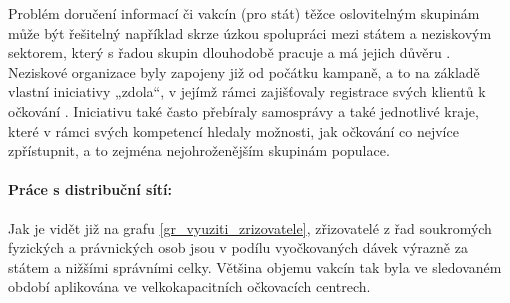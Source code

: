 Problém doručení informací či vakcín (pro stát) těžce oslovitelným skupinám může být řešitelný například skrze úzkou spolupráci mezi státem a neziskovým sektorem, který s řadou skupin dlouhodobě pracuje a má jejich důvěru \cite{logoc_bilamista}. Neziskové organizace byly zapojeny již od počátku kampaně, a to na základě vlastní iniciativy „zdola“, v jejímž rámci zajišťovaly registrace svých klientů k očkování \cite{ocko_ngo}. Iniciativu také často přebíraly samosprávy a také jednotlivé kraje, které v rámci svých kompetencí hledaly možnosti, jak očkování co nejvíce zpřístupnit, a to zejména nejohroženějším skupinám populace. 




\paragraph{Práce s distribuční sítí:} Jak je vidět již na grafu \ref{gr_vyuziti_zrizovatele}, zřizovatelé z řad soukromých fyzických a právnických osob jsou v podílu vyočkovaných dávek výrazně za státem a nižšími správními celky. Většina objemu vakcín tak byla ve sledovaném období aplikována ve velkokapacitních očkovacích centrech.%



